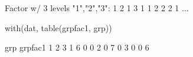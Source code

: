 \begin{Schunk}
\begin{Soutput}
 Factor w/ 3 levels "1","2","3": 1 2 1 3 1 1 2 2 2 1 ...
\end{Soutput}
\begin{Sinput}
  with(dat, table(grpfac1, grp))
\end{Sinput}
\begin{Soutput}
       grp
grpfac1 1 2 3
      1 6 0 0
      2 0 7 0
      3 0 0 6
\end{Soutput}
\end{Schunk}
